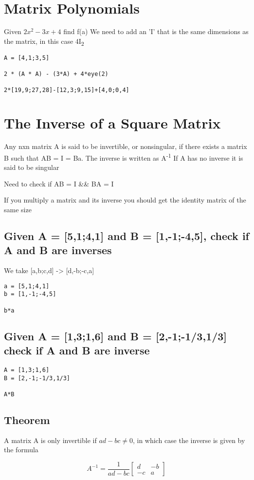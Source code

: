 \documentclass[11pt]{article}
\begin{document}
\section{Matrix Polynomials}
\label{sec:org1ec76fd}
Given \(2x^{2}-3x+4\) find f(a)
We need to add an 'I' that is the same dimensions as the matrix, in this case 4I\textsubscript{2}
\begin{verbatim}
A = [4,1;3,5]

2 * (A * A) - (3*A) + 4*eye(2)

2*[19,9;27,28]-[12,3;9,15]+[4,0;0,4]
\end{verbatim}
\section{The Inverse of a Square Matrix}
\label{sec:orga5c9bd0}
Any nxn matrix A is said to be invertible, or nonsingular, if there exists a matrix B such that AB = I = Ba.
The inverse is written as A\textsuperscript{-1}
If A has no inverse it is said to be singular

Need to check if AB = I \&\& BA = I

If you multiply a matrix and its inverse you should get the identity matrix of the same size
\subsection{Given A = [5,1;4,1] and B = [1,-1;-4,5], check if A and B are inverses}
\label{sec:org00c6f79}
We take [a,b;c,d] -> [d,-b;-c,a]

\begin{verbatim}
a = [5,1;4,1]
b = [1,-1;-4,5]

b*a
\end{verbatim}
\subsection{Given A = [1,3;1,6] and B = [2,-1;-1/3,1/3] check if A and B are inverse}
\label{sec:orge9c67b9}
\begin{verbatim}
A = [1,3;1,6]
B = [2,-1;-1/3,1/3]

A*B
\end{verbatim}
\subsection{Theorem}
\label{sec:org75aeb11}
A matrix A is only invertible if \(ad-bc \neq 0\), in which case the inverse is given by the formula

\[
A^{-1} = \frac{1}{ad-bc}\begin{bmatrix}d & -b \\ -c & a\end{bmatrix}
\]
\end{document}
